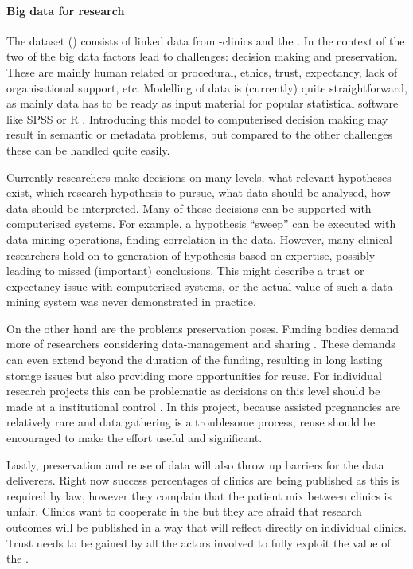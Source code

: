 \paragraph{Big data for \project{} research}
The \project{} dataset (\projectdata{}) consists of linked data from \IVF{}-clinics and the \PRN{}.
In the context of the \projectdata{} two of the big data factors lead to challenges: decision making and preservation.
These are mainly human related or procedural, \eg{} ethics, trust, expectancy, lack of organisational support, etc.
Modelling of data is (currently) quite straightforward, as mainly data has to be ready as input material for popular statistical software like SPSS \cite{spssSoftware} or R \cite{rSoftware}.
Introducing this model to computerised decision making may result in semantic or metadata problems, but compared to the other challenges these can be handled quite easily.

Currently researchers make decisions on many levels, \eg{} what relevant hypotheses exist, which research hypothesis to pursue, what data should be analysed, how data should be interpreted.
Many of these decisions can be supported with computerised systems.
For example, a hypothesis ``sweep'' can be executed with data mining operations, finding correlation in the data.
However, many clinical researchers hold on to generation of hypothesis based on expertise, possibly leading to missed (important) conclusions.
This might describe a trust or expectancy issue with computerised systems, or the actual value of such a data mining system was never demonstrated in practice.

On the other hand are the problems preservation poses.
Funding bodies demand more of researchers considering data-management and sharing \cite{dsb3lynch}.
These demands can even extend beyond the duration of the funding, resulting in long lasting storage issues but also providing more opportunities for reuse.
For individual research projects this can be problematic as decisions on this level should be made at a institutional control \cite{dsb3lynch}.
In this project, because assisted pregnancies are relatively rare and data gathering is a troublesome process, reuse should be encouraged to make the effort useful and significant.

Lastly, preservation and reuse of data will also throw up barriers for the data deliverers.
Right now success percentages of clinics are being published as this is required by law, however they complain that the patient mix between clinics is unfair.
Clinics want to cooperate in the \project{} but they are afraid that research outcomes will be published in a way that will reflect directly on individual clinics. 
Trust needs to be gained by all the actors involved to fully exploit the value of the \project{}.

